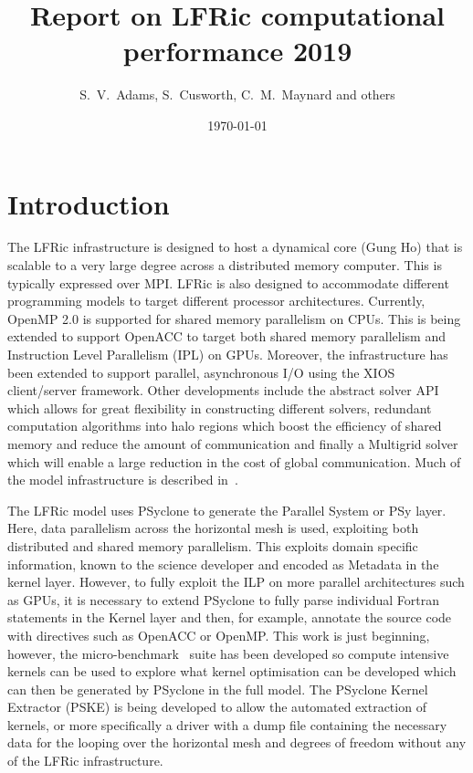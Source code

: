 \documentclass[11pt]{article}
\author{S.~V.~Adams, S.~Cusworth, C.~M.~Maynard and others}
\title{Report on LFRic computational performance 2019}
\date{\today}
\begin{document}
\maketitle
\medskip
\section{Introduction\label{sec:intro}}
The LFRic infrastructure is designed to host a dynamical core (Gung Ho)
that is scalable to a very large degree across a distributed memory
computer. This is typically expressed over MPI. LFRic is also designed
to accommodate different programming models to target different
processor architectures. Currently, OpenMP 2.0 is supported for shared
memory parallelism on CPUs. This is being extended to support OpenACC
to target both shared memory parallelism and Instruction Level
Parallelism (IPL) on GPUs. Moreover, the infrastructure has been
extended to support parallel, asynchronous I/O using the XIOS
client/server framework.
Other developments include the abstract solver API which allows for great
flexibility in constructing different solvers, redundant computation
algorithms into halo regions which boost the efficiency of shared
memory and reduce the amount of communication and finally a Multigrid
solver which will enable a large reduction in the cost of global communication.
Much of the model infrastructure is described in~\cite{LFRic}.

The LFRic model uses PSyclone to generate the Parallel System or PSy
layer. Here, data parallelism across the horizontal mesh is used,
exploiting both distributed and shared memory parallelism. This
exploits domain specific information, known to the science developer
and encoded as Metadata in the kernel layer. However, to
fully exploit the ILP on more parallel architectures such as GPUs, it
is necessary to extend PSyclone to fully parse individual Fortran
statements in the Kernel layer and then, for example, annotate the
source code with directives such as OpenACC or OpenMP. This work is just beginning,
however, the micro-benchmark~\cite{lfric-microbenchmarks} suite has been
developed so compute intensive kernels can be used to explore what kernel
optimisation can be developed which can then be generated by PSyclone in the full
model. The PSyclone Kernel Extractor (PSKE) is being developed to
allow the automated extraction of kernels, or more specifically a
driver with a dump file containing the necessary data for the looping
over the horizontal mesh and degrees of freedom without any of the
LFRic infrastructure.
\end{document}
